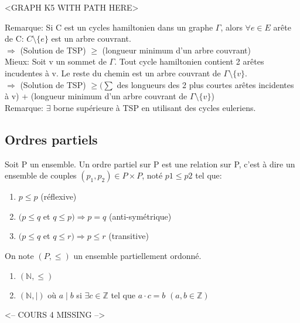 \begin{exmp}
<GRAPH K5 WITH PATH HERE>\\
\end{exmp}

Remarque: Si C est un cycles hamiltonien dans un graphe $\Gamma$, alors $\forall e \in E$ arête de C: $ C \setminus\{e\}$ est un arbre couvrant.\\

$\Rightarrow$ (Solution de TSP) $\geq$ (longueur minimum d'un arbre couvrant)\\

Mieux: Soit v un sommet de $\Gamma$. Tout cycle hamiltonien contient 2 arêtes incudentes à v. Le reste du chemin est un arbre couvrant de $\Gamma \setminus\{v\}$.\\

$\Rightarrow$ (Solution de TSP) $\geq (\sum$ des longueurs des 2 plus courtes arêtes incidentes à v) + (longueur minimum d'un arbre couvrant de $\Gamma \setminus\{v\}$)\\

Remarque: $\exists$ borne supérieure à TSP en utilisant des cycles euleriens. \\

\subsection{Ordres partiels}

\begin{defn}
Soit P un ensemble. Un ordre partiel sur P est une relation sur P, c'est à dire un ensemble de couples $(p_{1},p_{2}) \in P\times P$, noté $p{1} \leq p{2}$ tel que:
	\begin{enumerate}
		\item $p \leq p$ (réflexive)
		\item $(p \leq q$ et $q \leq p ) \Rightarrow p = q$ (anti-symétrique)
		\item $(p \leq q$ et $q \leq r ) \Rightarrow p \leq r$ (transitive)\\
	\end{enumerate}
On note $(P,\leq)$ un ensemble partiellement ordonné.\\
\end{defn}

\begin{exmp}
	\begin{enumerate}
		\item $(\mathbb{N},\leq)$
		\item $(\mathbb{N},\mid)$ où $a \mid b$ si $\exists c \in \mathbb{Z}$ tel que $a \cdot c = b$ $(a,b \in \mathbb{Z})$\\
	\end{enumerate}
\end{exmp}



\newpage
<-- COURS 4 MISSING -->
\newpage


